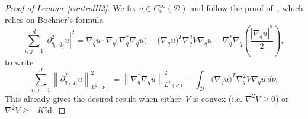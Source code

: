 \documentclass[10pt]{amsart}
\theoremstyle{definition}\newtheorem{defi}[theo]{Definition}\newtheorem{rema}[theo]{Remark}\newtheorem{exam}[theo]{Example}\newtheorem{exem}[theo]{Example}\newtheorem{nota}[theo]{Notation}
\newcommand{\rmc}{\mathrm{c}}
\newcommand{\Id}{\mathrm{Id}}
\newcommand{\cD}{\mathcal{D}}
\renewcommand{\geq}{\geqslant}
\begin{document}
\begin{proof}[Proof of Lemma~\ref{controlH2}]
We fix $u \in C_\rmc^\infty(\cD)$ and follow the proof of~\cite[Lemma~2.3]{CLW19}, which relies on Bochner's formula
\[
\sum_{i,\,j=1}^{d} \left|\partial_{q_i,\,q_j}^2 u\right|^2 = \nabla_q u\cdot \nabla_q \big(\nabla^{*}_q\nabla_q u\big) - \big(\nabla_q u\big)^T\nabla_q^2 V \nabla_q u-\nabla_q^{*}\nabla_q\left(\frac{\left|\nabla_q u\right|^2}{2}\right),
\]
to write
\begin{equation}\label{Bochnereq}
\sum_{i,\,j=1}^{d} \left\|\partial_{q_i,\,q_j}^2 u\right\|^2_{L^2(\nu)} = \left\|\nabla_q^{*}\nabla_q u\right\|^2_{L^2(\nu)} - \int_\cD \big(\nabla_q u\big)^T \nabla_q^2 V \nabla_q u \, d\nu.
\end{equation}
This already gives the desired result when either~$V$ is convex (i.e. $\nabla^2 V \geq 0$) or $\nabla^2 V \geq -K \Id$.


\end{proof}
\end{document}
